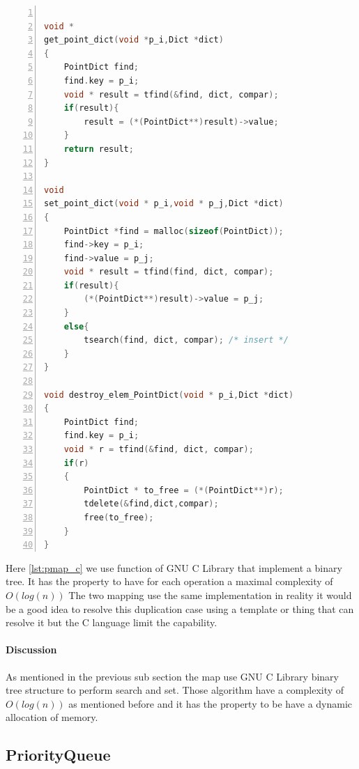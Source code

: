 \begin{minipage}{\linewidth}
\begin{lstlisting}[language=C, % Spécifie le langage du code
caption={Point Map Methods}, % Légende du listing
label=lst:pmap_c, % Étiquette pour référencer le listing
numbers=left,
numberstyle=\tiny\color{gray},
stepnumber=1,
frame=single,
breaklines=true,
postbreak=\mbox{\textcolor{red}{$\hookrightarrow$}\space},
showstringspaces=false
]

void *
get_point_dict(void *p_i,Dict *dict)
{
	PointDict find;
	find.key = p_i;
	void * result = tfind(&find, dict, compar);
	if(result){
		result = (*(PointDict**)result)->value;
	}
	return result;
}

void
set_point_dict(void * p_i,void * p_j,Dict *dict)
{
	PointDict *find = malloc(sizeof(PointDict));
	find->key = p_i;
	find->value = p_j;
	void * result = tfind(find, dict, compar);
	if(result){
		(*(PointDict**)result)->value = p_j;
	}
	else{
		tsearch(find, dict, compar); /* insert */
	}
}

void destroy_elem_PointDict(void * p_i,Dict *dict)
{
	PointDict find;
	find.key = p_i;
	void * r = tfind(&find, dict, compar);
	if(r)
	{
		PointDict * to_free = (*(PointDict**)r);
		tdelete(&find,dict,compar);
		free(to_free);
	}
}

\end{lstlisting} 
\end{minipage}
\vspace{1pt}

Here \ref{lst:pmap_c} we use function of GNU C Library that implement a binary tree. It has the property to have for each operation a maximal complexity of $O(log(n))$ The two mapping use the same implementation in reality it would be a good idea to resolve this duplication case using a template or thing that can resolve it but the C language limit the capability.

\paragraph{Discussion}
As mentioned in the previous sub section the map use GNU C Library binary tree structure to perform search and set. Those algorithm have a complexity of $O(log(n))$ as mentioned before and it has the property to be have a dynamic allocation of memory.

\subsection{PriorityQueue}

